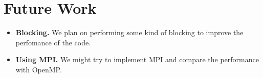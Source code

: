 \section{Future Work}\label{sec:future}

\begin{itemize}
	\item \textbf{Blocking.} We plan on performing some kind of blocking to improve the perfomance of the code.
	
	\item \textbf{Using MPI.} We might try to implement MPI and compare the performance with OpenMP. 
\end{itemize}